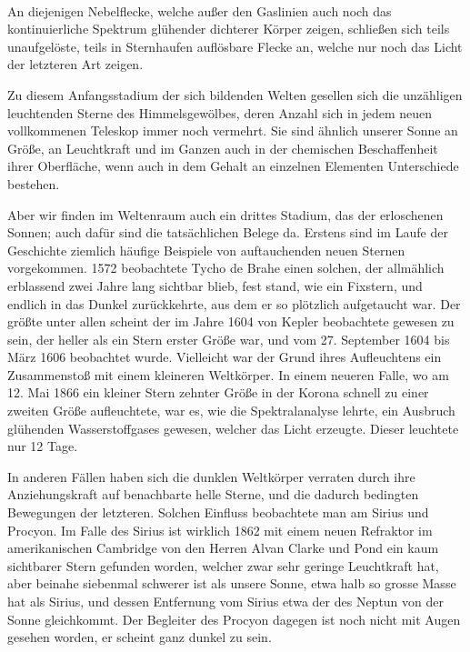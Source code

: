 \documentclass[a4paper, 11pt, oneside, german]{article}
\begin{document}
\paragraph{}
An diejenigen Nebelflecke, welche außer den Gaslinien auch noch das kontinuierliche Spektrum glühender dichterer Körper zeigen, schließen sich teils unaufgelöste, teils in Sternhaufen auflösbare Flecke an, welche nur noch das Licht der letzteren Art zeigen.

Zu diesem Anfangsstadium der sich bildenden Welten gesellen sich die unzähligen leuchtenden Sterne des Himmelsgewölbes, deren Anzahl sich in jedem neuen vollkommenen Teleskop immer noch vermehrt. Sie sind ähnlich unserer Sonne an Größe, an Leuchtkraft und im Ganzen auch in der chemischen Beschaffenheit ihrer Oberfläche, wenn auch in dem Gehalt an einzelnen Elementen Unterschiede bestehen.

Aber wir finden im Weltenraum auch ein drittes Stadium, das der erloschenen Sonnen; auch dafür sind die tatsächlichen Belege da. Erstens sind im Laufe der Geschichte ziemlich häufige Beispiele von auftauchenden neuen Sternen vorgekommen. 1572 beobachtete Tycho de Brahe einen solchen, der allmählich erblassend zwei Jahre lang sichtbar blieb, fest stand, wie ein Fixstern, und endlich in das Dunkel zurückkehrte, aus dem er so plötzlich aufgetaucht war. Der größte unter allen scheint der im Jahre 1604 von Kepler beobachtete gewesen zu sein, der heller als ein Stern erster Größe war, und vom 27. September 1604 bis März 1606 beobachtet wurde. Vielleicht war der Grund ihres Aufleuchtens ein Zusammenstoß mit einem kleineren Weltkörper. In einem neueren Falle, wo am 12. Mai 1866 ein kleiner Stern zehnter Größe in der Korona schnell zu einer zweiten Größe aufleuchtete, war es, wie die Spektralanalyse lehrte, ein Ausbruch glühenden Wasserstoffgases gewesen, welcher das Licht erzeugte. Dieser leuchtete nur 12 Tage.

In anderen Fällen haben sich die dunklen Weltkörper verraten durch ihre Anziehungskraft auf benachbarte helle Sterne, und die dadurch bedingten Bewegungen der letzteren. Solchen Einfluss beobachtete man am Sirius und Procyon. Im Falle des Sirius ist wirklich 1862 mit einem neuen Refraktor im amerikanischen Cambridge von den Herren Alvan Clarke und Pond ein kaum sichtbarer Stern gefunden worden, welcher zwar sehr geringe Leuchtkraft hat, aber beinahe siebenmal schwerer ist als unsere Sonne, etwa halb so grosse Masse hat als Sirius, und dessen Entfernung vom Sirius etwa der des Neptun von der Sonne gleichkommt. Der Begleiter des Procyon dagegen ist noch nicht mit Augen gesehen worden, er scheint ganz dunkel zu sein.
\end{document}
